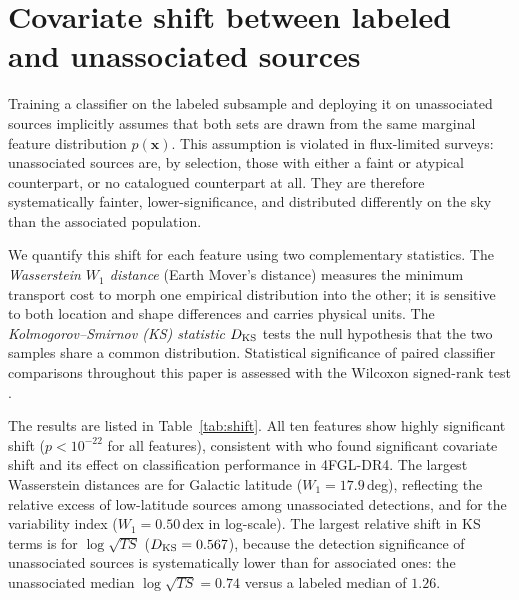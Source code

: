 \documentclass[fleqn,12pt]{article}
\newcommand{\fgl}{4FGL-DR4}
\begin{document}
\section{Covariate shift between labeled and unassociated sources}
\label{sec:shift}

Training a classifier on the labeled subsample and deploying it on
unassociated sources implicitly assumes that both sets are drawn from
the same marginal feature distribution $p(\mathbf{x})$. This
assumption is violated in flux-limited surveys: unassociated sources
are, by selection, those with either a faint or atypical counterpart,
or no catalogued counterpart at all. They are therefore systematically
fainter, lower-significance, and distributed differently on the sky
than the associated population.

We quantify this shift for each feature using two complementary
statistics. The \emph{Wasserstein $W_1$ distance} (Earth Mover's
distance) measures the minimum transport cost to morph one empirical
distribution into the other; it is sensitive to both location and
shape differences and carries physical units. The \emph{Kolmogorov--Smirnov
(KS) statistic} $D_{\rm KS}$ \citep{Massey1951} tests the null hypothesis that the two
samples share a common distribution. Statistical significance of
paired classifier comparisons throughout this paper is assessed with
the Wilcoxon signed-rank test \citep{Wilcoxon1945}.

The results are listed in Table~\ref{tab:shift}. All ten features show
highly significant shift ($p < 10^{-22}$ for all features), consistent
with \citet{MalyshevRASTI2023} who found significant covariate shift
and its effect on classification performance in \fgl{}. The largest
Wasserstein distances are for Galactic
latitude ($W_1 = 17.9$\,deg), reflecting the relative excess of
low-latitude sources among unassociated detections, and for the
variability index ($W_1 = 0.50$\,dex in log-scale). The largest
relative shift in KS terms is for $\log\sqrt{TS}$ ($D_{\rm KS} = 0.567$),
because the detection significance of unassociated sources is
systematically lower than for associated ones: the unassociated
median $\log\sqrt{TS} = 0.74$ versus a labeled median of $1.26$.
\end{document}
